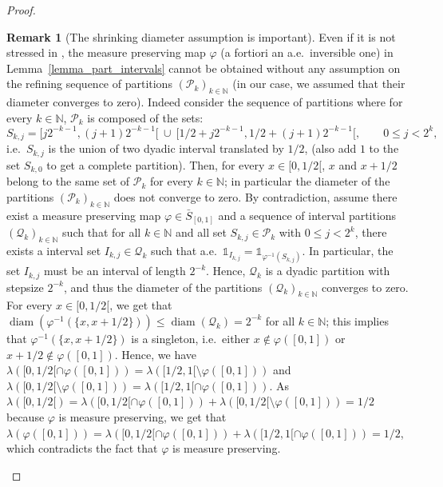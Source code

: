 \documentclass{amsart}
\newcommand{\aE}{a.e.\ }
\newcommand{\ie}{i.e.\ }
\theoremstyle{plain}
\theoremstyle{definition}
\newtheorem{remark}[Th]{Remark}
\newcommand{\cP}{\mathcal{P}}
\newcommand{\cQ}{\mathcal{Q}}
\newcommand{\Relabel}{\bar{S}_{[0,1]}}
\newcommand{\ind}{\mathds{1}}
\newcommand{\N}{\mathbb{N}}
\DeclareMathOperator{\diam}{diam}
\begin{document}
\begin{proof}
\begin{remark}[The shrinking diameter assumption is important]
	\label{rem_shrinking_diameter}
Even if it is not stressed in \cite[Proof of Theorem 9.23]{Lovasz},
	the measure preserving map $\varphi$ (a fortiori an \aE inversible one)
	in Lemma~\ref{lemma_part_intervals}
	cannot be obtained without any assumption on the refining sequence
	of partitions $(\cP_k)_{k\in\N}$ (in our case, we assumed that their diameter
		 converges to zero).
Indeed consider the sequence of partitions where for every $k\in\N$,
$\cP_k$ is composed of the sets:
	\[ S_{k,j} = [j 2^{-k-1}, (j+1) 2^{-k-1}[\ \cup\ [1/2 + j 2^{-k-1}, 1/2 + (j+1) 2^{-k-1}[ , 
		\qquad 0\leq j< 2^{k}, \]
\ie $S_{k,j}$ is the union of two dyadic interval translated by $1/2$, 
(also add $1$ to the set $S_{k,0}$ to get a complete partition).
Then, for every $x\in[0,1/2[$, $x$ and $x+1/2$ belong to the same set of $\cP_k$
	for every $k\in\N$; in particular the diameter of the partitions $(\cP_k)_{k\in\N}$
	does not converge to zero.
By contradiction, assume there exist a measure preserving map $\varphi\in\Relabel$
and a sequence of interval partitions $(\cQ_k)_{k\in\N}$ such that
	for all $k\in\N$ and all set $S_{k,j}\in\cP_k$ with $0\leq j < 2^{k}$,
	there exists a interval set $I_{k,j}\in\cQ_k$
	such that \aE $\ind_{I_{k,j}} = \ind_{\varphi^{-1}(S_{k,j})}$.
In particular, the set $I_{k,j}$ must be an interval of length $2^{-k}$.
Hence, $\cQ_k$ is a dyadic partition with stepsize $2^{-k}$,
	and thus the diameter of the partitions $(\cQ_k)_{k\in\N}$ 
	converges to zero.
For every $x\in[0,1/2[$, 
	we get that $\diam( \varphi^{-1}(\{ x, x+1/2 \}) )
		\leq \diam(\cQ_k) = 2^{-k}$ for all $k\in\N$;
	this implies  that $\varphi^{-1}(\{ x, x+1/2 \})$ is a singleton,
	\ie either $x\not\in\varphi([0,1])$ or  $x+1/2 \not\in\varphi([0,1])$.
Hence, we have 
	$\lambda([0,1/2[ \cap \varphi([0,1])) = \lambda( [1/2,1[ \setminus \varphi([0,1]))$
	and $\lambda([0,1/2[ \setminus \varphi([0,1])) = \lambda( [1/2,1[ \cap \varphi([0,1]))$.
As $\lambda([0,1/2[) = \lambda([0,1/2[ \cap \varphi([0,1])) + \lambda([0,1/2[ \setminus \varphi([0,1])) 
	= 1/2$
	because $\varphi$ is measure preserving,
	we get that $\lambda(\varphi([0,1]) )
		= \lambda([0,1/2[ \cap \varphi([0,1])) + \lambda([1/2,1[ \cap \varphi([0,1]))
		= 1/2$,
	which contradicts the fact that $\varphi$ is measure preserving.	
\end{remark}




\end{proof}
\end{document}
